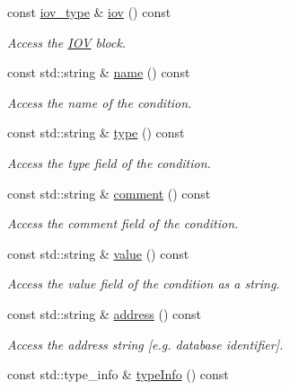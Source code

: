 \begin{DoxyCompactItemize}
const \hyperlink{class_d_d4hep_1_1_conditions_1_1_condition_ad84300e226b2085ec5e9db7f47be5539}{iov\+\_\+type} \& \hyperlink{class_d_d4hep_1_1_conditions_1_1_condition_a9370350f5fb154e29346489c368f3e8a}{iov} () const
\begin{DoxyCompactList}\small\item\em Access the \hyperlink{class_d_d4hep_1_1_i_o_v}{I\+OV} block. \end{DoxyCompactList}\item 
const std\+::string \& \hyperlink{class_d_d4hep_1_1_conditions_1_1_condition_ac4ff098ddb6634b752b93e6acddc23c8}{name} () const
\begin{DoxyCompactList}\small\item\em Access the name of the condition. \end{DoxyCompactList}\item 
const std\+::string \& \hyperlink{class_d_d4hep_1_1_conditions_1_1_condition_ab7536a2d10c19c6d94f34e11b13f76c5}{type} () const
\begin{DoxyCompactList}\small\item\em Access the type field of the condition. \end{DoxyCompactList}\item 
const std\+::string \& \hyperlink{class_d_d4hep_1_1_conditions_1_1_condition_aa3f9ebc9c6ce338f5a688dd268192031}{comment} () const
\begin{DoxyCompactList}\small\item\em Access the comment field of the condition. \end{DoxyCompactList}\item 
const std\+::string \& \hyperlink{class_d_d4hep_1_1_conditions_1_1_condition_a7f9601669ce1343a47389c077cc21726}{value} () const
\begin{DoxyCompactList}\small\item\em Access the value field of the condition as a string. \end{DoxyCompactList}\item 
const std\+::string \& \hyperlink{class_d_d4hep_1_1_conditions_1_1_condition_a76a22a570def6fe909d6c955445441df}{address} () const
\begin{DoxyCompactList}\small\item\em Access the address string \mbox{[}e.\+g. database identifier\mbox{]}. \end{DoxyCompactList}\item 
const std\+::type\+\_\+info \& \hyperlink{class_d_d4hep_1_1_conditions_1_1_condition_a020822867189328e00a3bf3c490d9e87}{type\+Info} () const

\end{DoxyCompactItemize}
